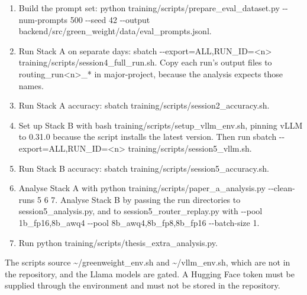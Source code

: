 \begin{enumerate}
\item Build the prompt set: python training/scripts/prepare\_\allowbreak{}eval\_\allowbreak{}dataset.py -{}-num-prompts 500 -{}-seed 42 -{}-output backend/src/green\_\allowbreak{}weight/data/eval\_\allowbreak{}prompts.jsonl.
\item Run Stack A on separate days: sbatch -{}-export=ALL,RUN\_\allowbreak{}ID=\textless{}n\textgreater{} training/scripts/session4\_\allowbreak{}full\_\allowbreak{}run.sh. Copy each run's output files to routing\_\allowbreak{}run\textless{}n\textgreater{}\_\allowbreak{}* in major-project, because the analysis expects those names.
\item Run Stack A accuracy: sbatch training/scripts/session2\_\allowbreak{}accuracy.sh.
\item Set up Stack B with bash training/scripts/setup\_\allowbreak{}vllm\_\allowbreak{}env.sh, pinning vLLM to 0.31.0 because the script installs the latest version. Then run sbatch -{}-export=ALL,RUN\_\allowbreak{}ID=\textless{}n\textgreater{} training/scripts/session5\_\allowbreak{}vllm.sh.
\item Run Stack B accuracy: sbatch training/scripts/session5\_\allowbreak{}accuracy.sh.
\item Analyse Stack A with python training/scripts/paper\_\allowbreak{}a\_\allowbreak{}analysis.py -{}-clean-runs 5 6 7. Analyse Stack B by passing the run directories to session5\_\allowbreak{}analysis.py, and to session5\_\allowbreak{}router\_\allowbreak{}replay.py with -{}-pool 1b\_\allowbreak{}fp16,8b\_\allowbreak{}awq4 -{}-pool 8b\_\allowbreak{}awq4,8b\_\allowbreak{}fp8,8b\_\allowbreak{}fp16 -{}-batch-size 1.
\item Run python training/scripts/thesis\_\allowbreak{}extra\_\allowbreak{}analysis.py.
\end{enumerate}
The scripts source \textasciitilde{}/greenweight\_\allowbreak{}env.sh and \textasciitilde{}/vllm\_\allowbreak{}env.sh, which are not in the repository, and the Llama models are gated. A Hugging Face token must be supplied through the environment and must not be stored in the repository.

